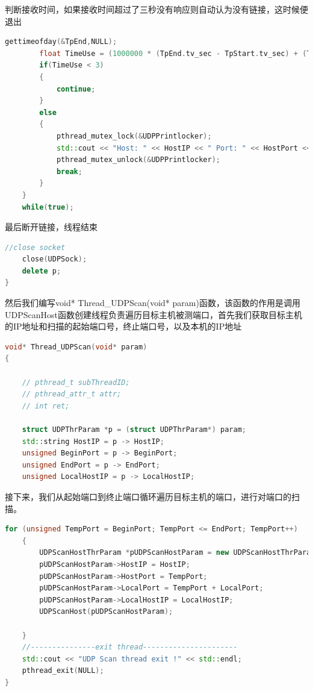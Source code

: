 \documentclass[UTF8,a4paper,10pt]{ctexart}
\begin{document}
判断接收时间，如果接收时间超过了三秒没有响应则自动认为没有链接，这时候便退出
\begin{lstlisting}[language = C++]
    gettimeofday(&TpEnd,NULL);
		float TimeUse = (1000000 * (TpEnd.tv_sec - TpStart.tv_sec) + (TpEnd.tv_usec - TpStart.tv_usec)) / 1000000.0;
		if(TimeUse < 3)
		{
			continue;
		}
		else
		{
			pthread_mutex_lock(&UDPPrintlocker);
			std::cout << "Host: " << HostIP << " Port: " << HostPort << " open !" << std::endl;
			pthread_mutex_unlock(&UDPPrintlocker);
			break;
		}
	} 
	while(true);
\end{lstlisting}
最后断开链接，线程结束
\begin{lstlisting}[language = C++]
    //close socket
	close(UDPSock);
	delete p;
}
\end{lstlisting}
然后我们编写void* Thread\_UDPScan(void* param)函数，该函数的作用是调用UDPScanHost函数创建线程负责遍历目标主机被测端口，首先我们获取目标主机的IP地址和扫描的起始端口号，终止端口号，以及本机的IP地址
\begin{lstlisting}[language = C++]
void* Thread_UDPScan(void* param)
{

	// pthread_t subThreadID;
	// pthread_attr_t attr;
	// int ret;
    
	struct UDPThrParam *p = (struct UDPThrParam*) param;
	std::string HostIP = p -> HostIP;
	unsigned BeginPort = p -> BeginPort;
	unsigned EndPort = p -> EndPort;
	unsigned LocalHostIP = p -> LocalHostIP;
\end{lstlisting}
接下来，我们从起始端口到终止端口循环遍历目标主机的端口，进行对端口的扫描。
\begin{lstlisting}[language = C++]
    for (unsigned TempPort = BeginPort; TempPort <= EndPort; TempPort++) 
	{
        UDPScanHostThrParam *pUDPScanHostParam = new UDPScanHostThrParam;
        pUDPScanHostParam->HostIP = HostIP;
		pUDPScanHostParam->HostPort = TempPort;
        pUDPScanHostParam->LocalPort = TempPort + LocalPort;
        pUDPScanHostParam->LocalHostIP = LocalHostIP;
		UDPScanHost(pUDPScanHostParam);

	}
    //---------------exit thread----------------------
    std::cout << "UDP Scan thread exit !" << std::endl;
	pthread_exit(NULL);
}
\end{lstlisting}
\end{document}
